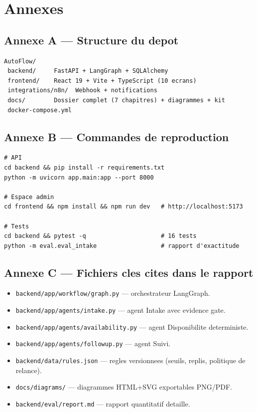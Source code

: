 \documentclass[12pt,a4paper,openany]{report}
\begin{document}
\appendix
\chapter{Annexes}

\section*{Annexe A --- Structure du depot}
\begin{lstlisting}
AutoFlow/
 backend/     FastAPI + LangGraph + SQLAlchemy
 frontend/    React 19 + Vite + TypeScript (10 ecrans)
 integrations/n8n/  Webhook + notifications
 docs/        Dossier complet (7 chapitres) + diagrammes + kit
 docker-compose.yml
\end{lstlisting}

\section*{Annexe B --- Commandes de reproduction}
\begin{lstlisting}
# API
cd backend && pip install -r requirements.txt
python -m uvicorn app.main:app --port 8000

# Espace admin
cd frontend && npm install && npm run dev   # http://localhost:5173

# Tests
cd backend && pytest -q                     # 16 tests
python -m eval.eval_intake                  # rapport d'exactitude
\end{lstlisting}

\section*{Annexe C --- Fichiers cles cites dans le rapport}
\begin{itemize}[leftmargin=1.5cm]
\item \texttt{backend/app/workflow/graph.py} --- orchestrateur LangGraph.
\item \texttt{backend/app/agents/intake.py} --- agent Intake avec evidence gate.
\item \texttt{backend/app/agents/availability.py} --- agent Disponibilite deterministe.
\item \texttt{backend/app/agents/followup.py} --- agent Suivi.
\item \texttt{backend/data/rules.json} --- regles versionnees (seuils, replis, politique de relance).
\item \texttt{docs/diagrams/} --- diagrammes HTML+SVG exportables PNG/PDF.
\item \texttt{backend/eval/report.md} --- rapport quantitatif detaille.
\end{itemize}
\end{document}
